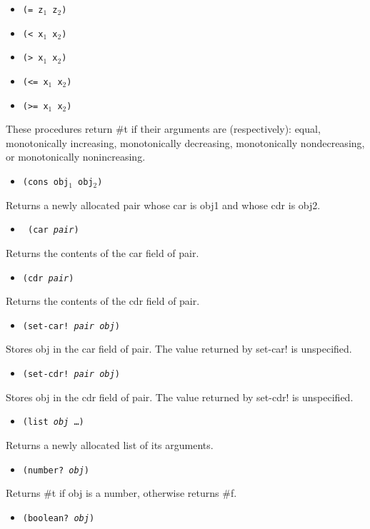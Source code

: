 \documentclass{article}
\begin{document}
\begin{itemize}
\item \texttt{(= z$_1$ z$_2$)}
\item \texttt{(< x$_1$ x$_2$)}
\item \texttt{(> x$_1$ x$_2$)}
\item \texttt{(<= x$_1$ x$_2$)}
\item \texttt{(>= x$_1$ x$_2$)}
\end{itemize}
These procedures return \#t if their arguments are (respectively): equal, monotonically increasing, monotonically decreasing, monotonically nondecreasing, or monotonically nonincreasing.\\
\begin{itemize}
\item \texttt{(cons obj$_1$ obj$_2$)}
\end{itemize}
Returns a newly allocated pair whose car is obj1 and whose cdr is obj2.
\begin{itemize}
\item \texttt{ (car \textit{pair})}
\end{itemize}
Returns the contents of the car field of pair.
\begin{itemize}
\item \texttt{(cdr \textit{pair})}
\end{itemize}
Returns the contents of the cdr field of pair.
\begin{itemize}
\item \texttt{(set-car! \textit{pair} \textit{obj})}
\end{itemize}
Stores obj in the car field of pair. The value returned by set-car! is unspecified.
\begin{itemize}
\item \texttt{(set-cdr! \textit{pair} \textit{obj})}
\end{itemize}
Stores obj in the cdr field of pair. The value returned by set-cdr! is unspecified.
\begin{itemize}
\item \texttt{(list \textit{obj} \dots)}
\end{itemize}
Returns a newly allocated list of its arguments.
\begin{itemize}
\item \texttt{(number? \textit{obj})}
\end{itemize}
Returns \#t if obj is a number, otherwise returns \#f.
\begin{itemize}
\item \texttt{(boolean? \textit{obj})}
\end{itemize}
\end{document}
